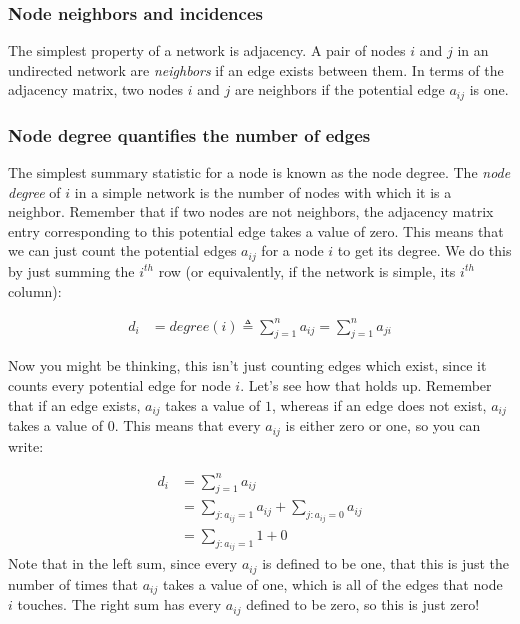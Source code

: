 \subsubsection{Node neighbors and incidences}

The simplest property of a network is {adjacency}. A pair of nodes $i$ and $j$ in an undirected network are \textit{neighbors} if an edge exists between them. In terms of the adjacency matrix, two nodes $i$ and $j$ are neighbors if the potential edge $a_{ij}$ is one.

\subsubsection{Node degree quantifies the number of edges}
\label{sec:ch4:prop-net:degree}
The simplest summary statistic for a node is known as the {node degree}. The \textit{node degree} of $i$ in a simple network is the number of nodes with which it is a neighbor. Remember that if two nodes are not neighbors, the adjacency matrix entry corresponding to this {potential} edge takes a value of zero. This means that we can just count the potential edges $a_{ij}$ for a node $i$ to get its degree. We do this by just summing the $i^{th}$ row (or equivalently, if the network is simple, its $i^{th}$ column):

\begin{align}
    d_i &= degree(i) \triangleq \sum_{j = 1}^n a_{ij} = \sum_{j = 1}^n a_{ji}\label{eqn:ch4:degree}
\end{align}

Now you might be thinking, this isn't just counting edges which exist, since it counts {every} potential edge for node $i$. Let's see how that holds up. Remember that if an edge exists, $a_{ij}$ takes a value of $1$, whereas if an edge does not exist, $a_{ij}$ takes a value of $0$. This means that every $a_{ij}$ is either zero or one, so you can write:

\begin{align*}
    d_i &= \sum_{j = 1}^n a_{ij} \\
    &= \sum_{j : a_{ij} = 1} a_{ij} + \sum_{j : a_{ij} = 0}a_{ij} \\
    &= \sum_{j : a_{ij} = 1}1 + 0
\end{align*}
Note that in the left sum, since every $a_{ij}$ is defined to be one, that this is just the number of times that $a_{ij}$ takes a value of one, which is all of the edges that node $i$ touches. The right sum has every $a_{ij}$ defined to be zero, so this is just zero!

